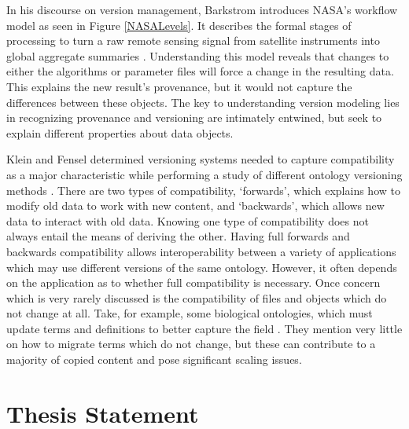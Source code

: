 In his discourse on version management, Barkstrom introduces NASA's workflow model as seen in Figure \ref{NASALevels}.
It describes the formal stages of processing to turn a raw remote sensing signal from satellite instruments into global aggregate summaries \cite{Barkstrom2003}.
Understanding this model reveals that changes to either the algorithms or parameter files will force a change in the resulting data.
This explains the new result's provenance, but it would not capture the differences between these objects.
The key to understanding version modeling lies in recognizing provenance and versioning are intimately entwined, but seek to explain different properties about data objects.

Klein and Fensel determined versioning systems needed to capture compatibility as a major characteristic while performing a study of different ontology versioning methods \cite{Klein01ontologyversioning}.
There are two types of compatibility, `forwards', which explains how to modify old data to work with new content, and `backwards', which allows new data to interact with old data.
Knowing one type of compatibility does not always entail the means of deriving the other.
Having full forwards and backwards compatibility allows interoperability between a variety of applications which may use different versions of the same ontology.
However, it often depends on the application as to whether full compatibility is necessary.
Once concern which is very rarely discussed is the compatibility of files and objects which do not change at all.
Take, for example, some biological ontologies, which must update terms and definitions to better capture the field \cite{Ochs:2015:SVS:2826733.2826866}.
They mention very little on how to migrate terms which do not change, but these can contribute to a majority of copied content and pose significant scaling issues.

\section{Thesis Statement}

